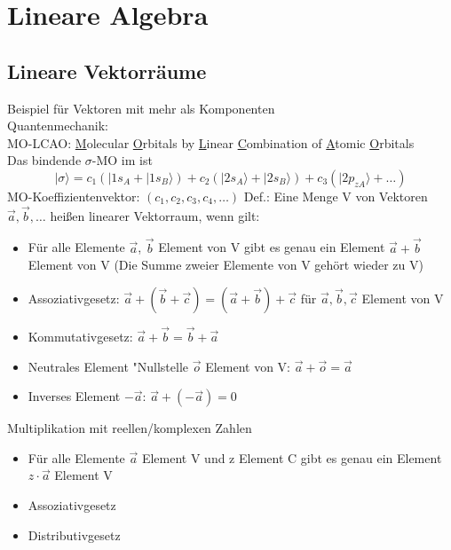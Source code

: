 \documentclass{article}
\begin{document}
\section{Lineare Algebra}
\subsection{Lineare Vektorräume}
Beispiel für Vektoren mit mehr als Komponenten\\
\hspace*{1cm} Quantenmechanik:\\
\hspace*{1cm} MO-LCAO: \underline{M}olecular \underline{O}rbitals by \underline{L}inear \underline{C}ombination of \underline{A}tomic \underline{O}rbitals\\
Das bindende $\sigma$-MO im  ist
\begin{equation*}
    |\sigma\rangle =c_1(|1s_A+|1s_B\rangle )+c_2(|2s_A\rangle +|2s_B\rangle )+c_3(|2p_{zA}\rangle +\dots)
\end{equation*}
MO-Koeffizientenvektor: $(c_1,c_2,c_3,c_4,\dots)$
Def.: Eine Menge V von Vektoren {${\vec{a},\vec{b},\dots}$} heißen linearer Vektorraum, wenn gilt:
\vspace*{1cm}
\begin{itemize}
    \item Für alle Elemente $\vec{a}$, $\vec{b}$ Element von V gibt es genau ein Element $\vec{a} + \vec{b}$ Element von V (Die Summe zweier Elemente von V gehört wieder zu V)
    \item Assoziativgesetz: $\vec{a}+(\vec{b}+\vec{c}) = (\vec{a}+\vec{b})+\vec{c}$ für $\vec{a}, \vec{b}, \vec{c}$ Element von V
    \item Kommutativgesetz: $\vec{a}+\vec{b} = \vec{b} + \vec{a}$
    \item Neutrales Element "Nullstelle $\vec{o}$ Element von V: $\vec{a} + \vec{o} = \vec{a}$
    \item Inverses Element $-\vec{a}$: $\vec{a} + (-\vec{a}) = 0$
\end{itemize}
Multiplikation mit reellen/komplexen Zahlen
\begin{itemize}
    \item Für alle Elemente $\vec{a}$ Element V und z Element C gibt es genau ein Element $z\cdot\vec{a}$ Element V
    \item Assoziativgesetz
    \item Distributivgesetz
\end{itemize}
\end{document}
